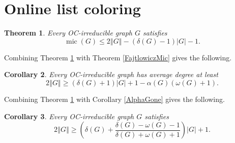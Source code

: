 \documentclass[12pt]{article}
\theoremstyle{plain}
\newtheorem{thm}{Theorem}[section]
\newtheorem{cor}[thm]{Corollary}
\theoremstyle{definition}
\theoremstyle{remark}
\newcommand{\card}[1]{\left|#1\right|}
\newcommand{\size}[1]{\left\Vert#1\right\Vert}
\newcommand{\parens}[1]{\left( #1 \right)}
\newcommand{\mic}{\operatorname{mic}}
\begin{document}
\section{Online list coloring}

\begin{thm}\label{ConsantListMicStrength} 
	Every OC-irreducible graph $G$ satisfies
	$$\mic(G)\leq2\size{G}-(\delta(G)-1)\card{G}-1.$$
	\end{thm}
Combining Theorem \ref{ConsantListMicStrength} with Theorem \ref{FajtlowiczMic} gives the following.

\begin{cor}\label{SizeBound1}
	Every OC-irreducible graph has average degree at least
	\[2\size{G} \ge (\delta(G) + 1)\card{G} + 1 - \alpha(G)(\omega(G) + 1).\]
\end{cor}

Combining Theorem \ref{ConsantListMicStrength} with Corollary \ref{AlphaGone} gives the following.

\begin{cor}\label{SizeBound2}
	Every OC-irreducible graph $G$ satisfies
	\[2\size{G} \ge \parens{\delta(G) + \frac{\delta(G) - \omega(G) - 1}{\delta(G) + \omega(G) + 1}}\card{G} + 1.\]
\end{cor}



\end{document}
